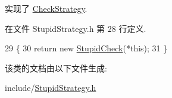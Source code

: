 实现了 \hyperlink{classCheckStrategy_ae3d41d899831bf33314db410d7f2f947}{Check\+Strategy}.



在文件 Stupid\+Strategy.\+h 第 28 行定义.


\begin{DoxyCode}
29     \{
30         \textcolor{keywordflow}{return} \textcolor{keyword}{new} \hyperlink{classStupidCheck_a5d9cfbf24ede46fe72f85817996081d2}{StupidCheck}(*\textcolor{keyword}{this});
31     \}
\end{DoxyCode}


该类的文档由以下文件生成\+:\begin{DoxyCompactItemize}
\item 
include/\hyperlink{StupidStrategy_8h}{Stupid\+Strategy.\+h}\end{DoxyCompactItemize}
